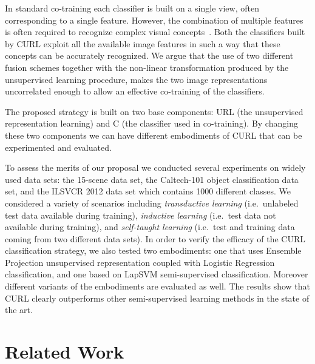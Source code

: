 \documentclass[journal,11pt]{IEEEtran}
\newcommand{\ADD}[1]{#1}
\newcommand{\coso}{strategy}
\newcommand{\emb}{embodiment}
\begin{document}
In standard co-training each classifier is built on a single view,
often corresponding to a single feature.  However, the combination of
multiple features is often required to recognize complex visual
concepts~\cite{Iyengar03,Gehler09,natarajan12}. Both the classifiers built by CURL exploit all
the available image features in such a way that these concepts can be
accurately recognized.  \ADD{We argue that} the use of two different fusion schemes
together with the non-linear transformation produced by the
unsupervised learning procedure, makes the two image representations
uncorrelated enough to allow an effective co-training of the
classifiers.

\ADD{The proposed \coso{ }is built on two base components: URL (the unsupervised representation learning) and C (the classifier used in co-training).
By changing these two components we can have different \emb{s} of CURL that can be experimented and evaluated.}%

To assess the merits of our proposal we conducted several experiments
on widely used data sets: the 15-scene data set\ADD{, the
Caltech-101 object classification data set, and the ILSVCR 2012 data set which contains 1000 different classes}.  We considered a variety
of scenarios including \emph{transductive learning} (i.e.~unlabeled test data
available during training), \emph{inductive learning} (i.e.~test data not
available during training), and \emph{self-taught learning} (i.e.~test and
training data coming from two different data sets).  \ADD{In order to verify the efficacy of the CURL classification \coso, we also tested two \emb{s}: one that uses Ensemble Projection unsupervised representation coupled with Logistic Regression classification, and one based on LapSVM semi-supervised classification.
Moreover different variants of the \emb{s} are evaluated as well.} The results
show that CURL clearly outperforms other semi-supervised learning
methods in the state of the art.


\section{Related Work}
\label{sec:related}
\end{document}
